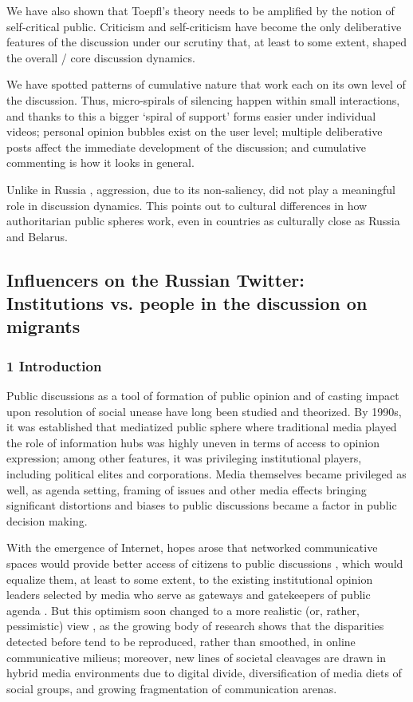 We have also shown that Toepfl’s theory \cite{Toepfl} needs to be amplified by the notion of self-critical public. Criticism and self-criticism have become the only deliberative features of the discussion under our scrutiny that, at least to some extent, shaped the overall / core discussion dynamics.

We have spotted patterns of cumulative nature that work each on its own level of the discussion. Thus, micro-spirals of silencing happen within small interactions, and thanks to this a bigger ‘spiral of support’ forms easier under individual videos; personal opinion bubbles exist on the user level; multiple deliberative posts affect the immediate development of the discussion; and cumulative commenting is how it looks in general.

Unlike in Russia \cite{BodrunovaLitvinenkoBlekanov2021}, aggression, due to its non-saliency, did not play a meaningful role in discussion dynamics. This points out to cultural differences in how authoritarian public spheres work, even in countries as culturally close as Russia and Belarus.


\subsection{Influencers on the Russian Twitter: Institutions vs. people in the discussion on migrants}\label{subsec:ch2/sec4/sub6}

\subsubsection{1 Introduction}

Public discussions as a tool of formation of public opinion and of casting impact upon resolution of social unease have long been studied and theorized. By 1990s, it was established that mediatized public sphere where traditional media played the role of information hubs was highly uneven in terms of access to opinion expression; among other features, it was privileging institutional players, including political elites and corporations. Media themselves became privileged as well, as agenda setting, framing of issues and other media effects bringing significant distortions and biases to public discussions \cite{ScheufeleTewksbury} became a factor in public decision making.

With the emergence of Internet, hopes arose that networked communicative spaces would provide better access of citizens to public discussions \cite{White1997}, which would equalize them, at least to some extent, to the existing institutional opinion leaders selected by media who serve as gateways and gatekeepers of public agenda \cite{White1950}. But this optimism soon changed to a more realistic (or, rather, pessimistic) view \cite{Fuchs}, as the growing body of research shows that the disparities detected before tend to be reproduced, rather than smoothed, in online communicative milieus; moreover, new lines of societal cleavages are drawn in hybrid media environments \cite{Chadwick} due to digital divide, diversification of media diets of social groups, and growing fragmentation of communication arenas.

